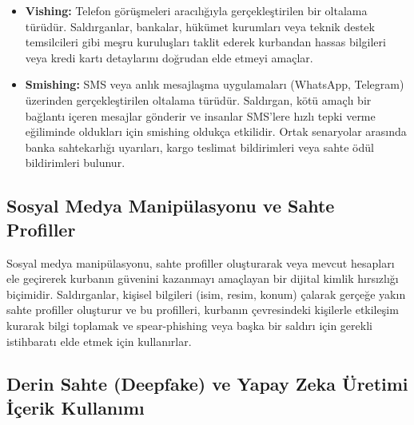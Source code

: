 \begin{itemize}
    \item \textbf{Vishing:} Telefon görüşmeleri aracılığıyla gerçekleştirilen bir oltalama türüdür. Saldırganlar, bankalar, hükümet kurumları veya teknik destek temsilcileri gibi meşru kuruluşları taklit ederek kurbandan hassas bilgileri veya kredi kartı detaylarını doğrudan elde etmeyi amaçlar.
    \item \textbf{Smishing:} SMS veya anlık mesajlaşma uygulamaları (WhatsApp, Telegram) üzerinden gerçekleştirilen oltalama türüdür. Saldırgan, kötü amaçlı bir bağlantı içeren mesajlar gönderir ve insanlar SMS'lere hızlı tepki verme eğiliminde oldukları için smishing oldukça etkilidir. Ortak senaryolar arasında banka sahtekarlığı uyarıları, kargo teslimat bildirimleri veya sahte ödül bildirimleri bulunur.
\end{itemize}

\subsection{Sosyal Medya Manipülasyonu ve Sahte Profiller}

Sosyal medya manipülasyonu, sahte profiller oluşturarak veya mevcut hesapları ele geçirerek kurbanın güvenini kazanmayı amaçlayan bir dijital kimlik hırsızlığı biçimidir. Saldırganlar, kişisel bilgileri (isim, resim, konum) çalarak gerçeğe yakın sahte profiller oluşturur ve bu profilleri, kurbanın çevresindeki kişilerle etkileşim kurarak bilgi toplamak ve spear-phishing veya başka bir saldırı için gerekli istihbaratı elde etmek için kullanırlar.

\subsection{Derin Sahte (Deepfake) ve Yapay Zeka Üretimi İçerik Kullanımı}

